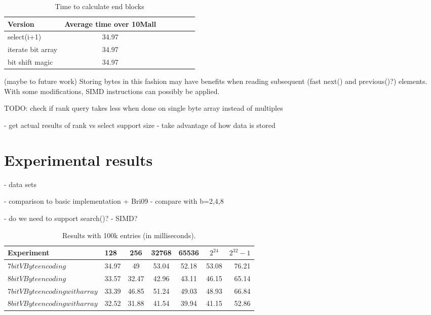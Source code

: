 \begin{table}
\centering
\caption{Time to calculate end blocks}
\begin{tabular}{l||c c c c c c} 
Version & Average time over 10Mall \\ 
\hline \hline 
select(i+1) & 34.97 \\
iterate bit array & 34.97 \\
bit shift magic & 34.97 \\
\hline
%
\end{tabular}
\label{endblockcall}
\end{table}

(maybe to future work) Storing bytes in this fashion may have benefits when reading subsequent (fast next() and previous()?) elements. With some modifications, SIMD instructions can possibly be applied.


TODO: check if rank query takes less when done on single byte array instead of multiples

 - get actual results of rank vs select support size
 - take advantage of how data is stored

     

\chapter{Experimental results}
 - data sets

- comparison to basic implementation + Bri09
  - compare with b=2,4,8

 - do we need to support search()?
 - SIMD?

\begin{table}
\centering
\caption{Results with 100k entries (in milliseconds).\label{table:results1}}
\begin{tabular}{l||l c c c c r} 
Experiment & 128 & 256 & 32768 & 65536 & $2^{24}$ & $2^{32} -1$\\ 
\hline \hline 
$7bit VByte encoding$ & 34.97 & 49 & 53.04 & 52.18 & 53.08 & 76.21\\
$8bit VByte encoding$ & 33.57 & 32.47 & 42.96 & 43.11 & 46.15 & 65.14\\
$7bit VByte encoding with array$ & 33.39 & 46.85 & 51.24 & 49.03 & 48.93 & 66.84 \\
$8bit VByte encoding with array$ & 32.52 & 31.88 & 41.54 & 39.94 & 41.15 & 52.86 \\

\hline
%
\end{tabular}
\end{table}


